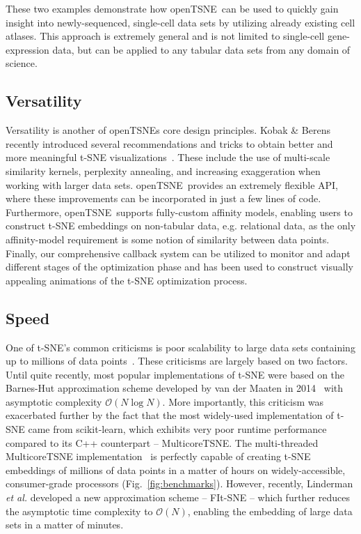 \documentclass[twocolumn]{bmcart}
\newcommand{\opentsne}{\textsf{openTSNE}}
\begin{document}
These two examples demonstrate how \opentsne\ can be used to quickly gain
insight into newly-sequenced, single-cell data sets by utilizing already
existing cell atlases. This approach is extremely
general and is not limited to single-cell gene-expression data, but can be
applied to any tabular data sets from any domain of science.

\subsection*{Versatility}

Versatility is another of  \opentsne s core design principles. Kobak \& Berens
recently introduced several recommendations and tricks to obtain better and
more meaningful t-SNE visualizations~\cite{kobak2019art}. These include the use
of multi-scale similarity kernels, perplexity annealing, and increasing
exaggeration when working with larger data sets. \opentsne\ provides an
extremely flexible API, where these improvements can be incorporated in just a
few lines of code. Furthermore, \opentsne\ supports fully-custom affinity models,
enabling users to construct t-SNE embeddings on
non-tabular data, e.g. relational data, as the only affinity-model requirement
is some notion of similarity between data points. Finally, our comprehensive
callback system can be utilized to monitor and adapt different stages of the
optimization phase and has been used to construct visually appealing animations
of the t-SNE optimization process.

\subsection*{Speed}

One of t-SNE's common criticisms is poor scalability to large data sets
containing up to millions of data points~\cite{becht2019dimensionality}. These
criticisms are largely based on two factors. Until quite recently, most popular
implementations of t-SNE were based on the Barnes-Hut approximation scheme
developed by van der Maaten in 2014~\cite{van2014accelerating} with asymptotic
complexity $\mathcal{O}(N \log N)$. More importantly, this criticism was
exacerbated further by the fact that the most widely-used implementation of
t-SNE came from \textsf{scikit-learn}, which exhibits very poor runtime
performance compared to its C++ counterpart -- \textsf{MulticoreTSNE}. The
multi-threaded \textsf{MulticoreTSNE} implementation~\cite{Ulyanov2016} is
perfectly capable of creating t-SNE embeddings of millions of data points in a
matter of hours on widely-accessible, consumer-grade processors
(Fig.~\ref{fig:benchmarks}). However, recently, Linderman \textit{et al.}
developed a new approximation scheme -- FIt-SNE -- which further reduces the
asymptotic time complexity to $\mathcal{O}(N)$, enabling the embedding of large
data sets in a matter of minutes.
\end{document}
